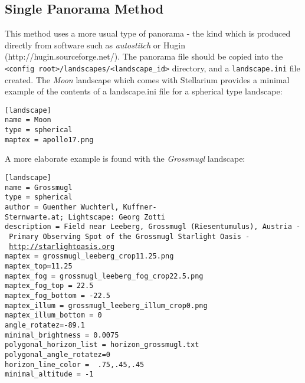 \subsection{Single Panorama Method}\label{single-panorama-method}

This method uses a more usual type of panorama - the kind which is
produced directly from software such as \emph{autostitch} or Hugin
(http://hugin.sourceforge.net/). The panorama file should be copied into
the
\texttt{\textless{}config\ root\textgreater{}/landscapes/\textless{}landscape\_id\textgreater{}}
directory, and a \texttt{landscape.ini} file created. The \emph{Moon}
landscape which comes with Stellarium provides a minimal example of the
contents of a landscape.ini file for a spherical type landscape:

\begin{config}
\texttt{{[}landscape{]}}\\
\texttt{name~=~Moon}\\
\texttt{type~=~spherical}\\
\texttt{maptex~=~apollo17.png}
\end{config}

A more elaborate example is found with the \emph{Grossmugl} landscape:

\begin{config}
\texttt{{[}landscape{]}}\\
\texttt{name~=~Grossmugl}\\
\texttt{type~=~spherical}\\
\texttt{author~=~Guenther~Wuchterl,~Kuffner-Sternwarte.at;~Lightscape:~Georg~Zotti}\\
\texttt{description~=~Field~near~Leeberg,~Grossmugl~(Riesentumulus),~Austria~-~Primary~Observing~Spot~of~the~Grossmugl~Starlight~Oasis~-~}\href{http://starlightoasis.org}{\texttt{http://starlightoasis.org}}\\
\texttt{maptex~=~grossmugl\_leeberg\_crop11.25.png}\\
\texttt{maptex\_top=11.25~}\\
\texttt{maptex\_fog~=~grossmugl\_leeberg\_fog\_crop22.5.png}\\
\texttt{maptex\_fog\_top~=~22.5}\\
\texttt{maptex\_fog\_bottom~=~-22.5}\\
\texttt{maptex\_illum~=~grossmugl\_leeberg\_illum\_crop0.png}\\
\texttt{maptex\_illum\_bottom~=~0}\\
\texttt{angle\_rotatez=-89.1}\\
\texttt{minimal\_brightness~=~0.0075}\\
\texttt{polygonal\_horizon\_list~=~horizon\_grossmugl.txt}\\
\texttt{polygonal\_angle\_rotatez=0}\\
\texttt{horizon\_line\_color~=~~.75,.45,.45}\\
\texttt{minimal\_altitude~=~-1}
\end{config}

